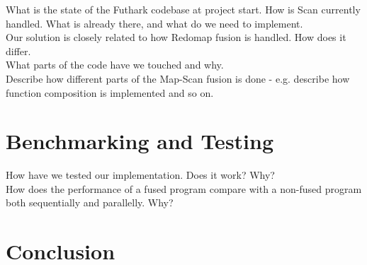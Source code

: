 \documentclass[11pt]{article}
\begin{document}
What is the state of the Futhark codebase at project start. How is Scan currently handled. What is already there, and what do we need to implement.\\
Our solution is closely related to how Redomap fusion is handled. How does it differ.\\
What parts of the code have we touched and why.\\
Describe how different parts of the Map-Scan fusion is done - e.g. describe how function composition is implemented and so on.


\section{Benchmarking and Testing}
How have we tested our implementation. Does it work? Why?\\
How does the performance of a fused program compare with a non-fused program both sequentially and parallelly. Why?

\section{Conclusion}
\newpage



\end{document}
